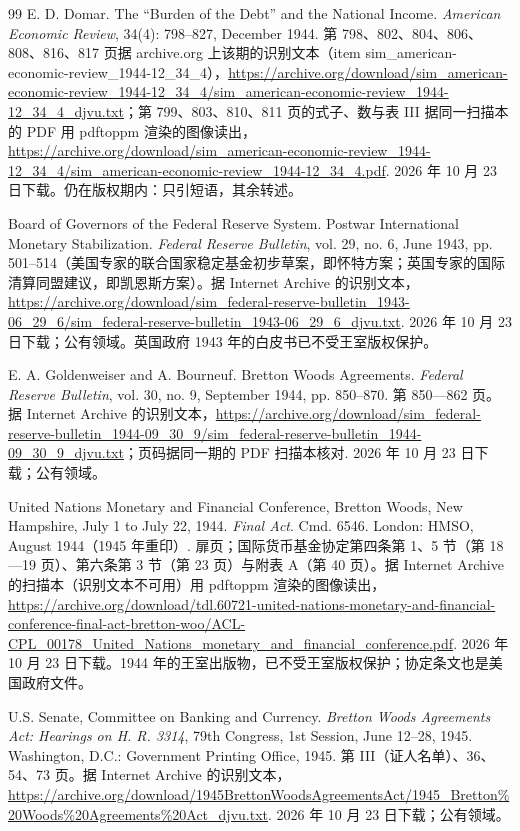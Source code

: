 \begin{thebibliography}{99}
 E. D. Domar. The ``Burden of the Debt'' and the National Income. \emph{American Economic Review}, 34(4): 798--827, December 1944. 第 798、802、804、806、808、816、817 页据 archive.org 上该期的识别文本（item sim\_american-economic-review\_1944-12\_34\_4），\url{https://archive.org/download/sim_american-economic-review_1944-12_34_4/sim_american-economic-review_1944-12_34_4_djvu.txt}；第 799、803、810、811 页的式子、数与表 III 据同一扫描本的 PDF 用 pdftoppm 渲染的图像读出，\url{https://archive.org/download/sim_american-economic-review_1944-12_34_4/sim_american-economic-review_1944-12_34_4.pdf}. 2026 年 10 月 23 日下载。仍在版权期内：只引短语，其余转述。

 Board of Governors of the Federal Reserve System. Postwar International Monetary Stabilization. \emph{Federal Reserve Bulletin}, vol. 29, no. 6, June 1943, pp. 501--514（美国专家的联合国家稳定基金初步草案，即怀特方案；英国专家的国际清算同盟建议，即凯恩斯方案）。据 Internet Archive 的识别文本，\url{https://archive.org/download/sim_federal-reserve-bulletin_1943-06_29_6/sim_federal-reserve-bulletin_1943-06_29_6_djvu.txt}. 2026 年 10 月 23 日下载；公有领域。英国政府 1943 年的白皮书已不受王室版权保护。

 E. A. Goldenweiser and A. Bourneuf. Bretton Woods Agreements. \emph{Federal Reserve Bulletin}, vol. 30, no. 9, September 1944, pp. 850--870. 第 850—862 页。据 Internet Archive 的识别文本，\url{https://archive.org/download/sim_federal-reserve-bulletin_1944-09_30_9/sim_federal-reserve-bulletin_1944-09_30_9_djvu.txt}；页码据同一期的 PDF 扫描本核对. 2026 年 10 月 23 日下载；公有领域。

 United Nations Monetary and Financial Conference, Bretton Woods, New Hampshire, July 1 to July 22, 1944. \emph{Final Act}. Cmd. 6546. London: HMSO, August 1944（1945 年重印）. 扉页；国际货币基金协定第四条第 1、5 节（第 18—19 页）、第六条第 3 节（第 23 页）与附表 A（第 40 页）。据 Internet Archive 的扫描本（识别文本不可用）用 pdftoppm 渲染的图像读出，\url{https://archive.org/download/tdl.60721-united-nations-monetary-and-financial-conference-final-act-bretton-woo/ACL-CPL_00178_United_Nations_monetary_and_financial_conference.pdf}. 2026 年 10 月 23 日下载。1944 年的王室出版物，已不受王室版权保护；协定条文也是美国政府文件。

 U.S. Senate, Committee on Banking and Currency. \emph{Bretton Woods Agreements Act: Hearings on H. R. 3314}, 79th Congress, 1st Session, June 12--28, 1945. Washington, D.C.: Government Printing Office, 1945. 第 III（证人名单）、36、54、73 页。据 Internet Archive 的识别文本，\url{https://archive.org/download/1945BrettonWoodsAgreementsAct/1945_Bretton\%20Woods\%20Agreements\%20Act_djvu.txt}. 2026 年 10 月 23 日下载；公有领域。


\end{thebibliography}
